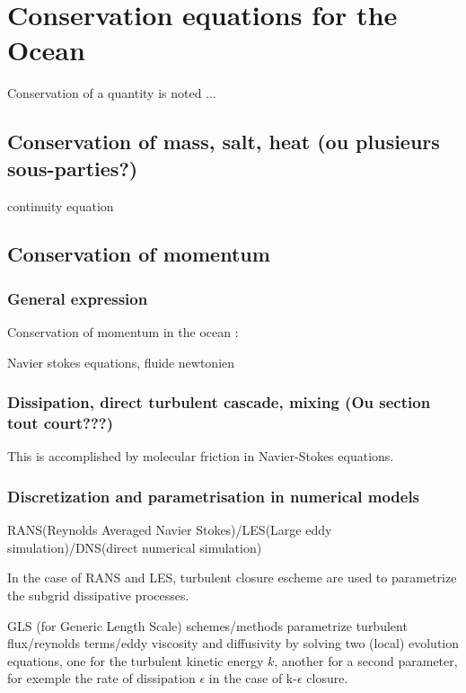 \hypersetup{pdfborder=0 0 0}



\section{Conservation equations for the Ocean}

Conservation of a quantity is noted ...

\subsection{Conservation of mass, salt, heat (ou plusieurs sous-parties?)}

continuity equation

\subsection{Conservation of momentum}

\subsubsection{General expression}

Conservation of momentum in the ocean :


Navier stokes equations, fluide newtonien



\subsubsection{Dissipation, direct turbulent cascade, mixing (Ou section tout court???)}

This is accomplished by molecular friction in Navier-Stokes equations. 

\subsubsection{Discretization and parametrisation in numerical models}

RANS(Reynolds Averaged Navier Stokes)/LES(Large eddy simulation)/DNS(direct numerical simulation)

In the case of RANS and LES, turbulent closure escheme are used to parametrize the subgrid dissipative processes.

GLS (for Generic Length Scale) schemes/methods parametrize turbulent flux/reynolds terms/eddy viscosity and diffusivity by solving two (local) evolution equations, one for the turbulent kinetic energy $k$, another for a second parameter, for exemple the rate of dissipation $\epsilon$ in the case of k-$\epsilon$ closure.

